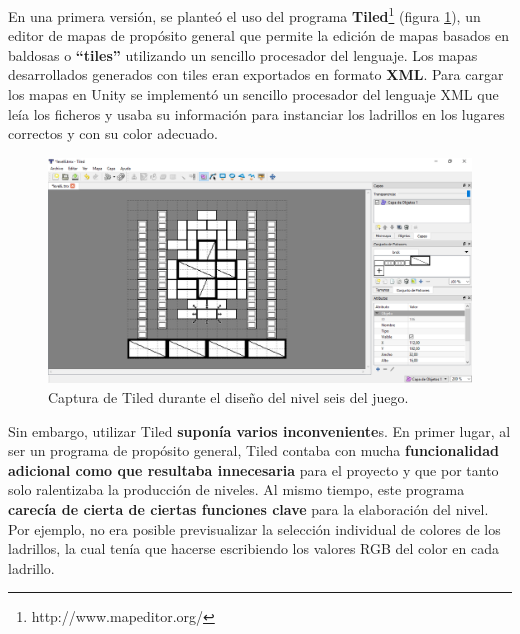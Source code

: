 En una primera versión, se planteó el uso del programa \textbf{Tiled}\footnote{http://www.mapeditor.org/} (figura \ref{tiled}), un editor de mapas de propósito general que permite la edición de mapas basados en baldosas o \textbf{``tiles''} utilizando un sencillo procesador del lenguaje. Los mapas desarrollados generados con tiles eran exportados en formato \textbf{XML}. Para cargar los mapas en Unity se implementó un sencillo procesador del lenguaje XML que leía los ficheros y usaba su información para instanciar los ladrillos en los lugares correctos y con su color adecuado.
\begin{figure}[!t]
    \centering
    \includegraphics[width=1\textwidth]{images/resultados/desarrollo/tiled}
    \caption{Captura de Tiled durante el diseño del nivel seis del juego.}
    \label{tiled}
\end{figure}

Sin embargo, utilizar Tiled \textbf{suponía varios inconveniente}s. En primer lugar, al ser un programa de propósito general, Tiled contaba con mucha \textbf{funcionalidad adicional como que resultaba innecesaria} para el proyecto y que por tanto solo ralentizaba la producción de niveles. Al mismo tiempo, este programa \textbf{carecía de cierta de ciertas funciones clave} para la elaboración del nivel. Por ejemplo, no era posible previsualizar la selección individual de colores de los ladrillos, la cual tenía que hacerse escribiendo los valores RGB del color en cada ladrillo.

